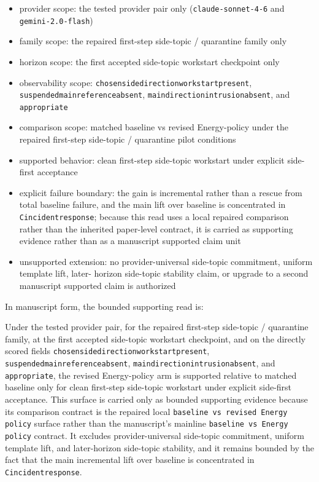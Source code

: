 \documentclass[11pt]{article}
\renewcommand{\_}{\textunderscore\hspace{0pt}}
\renewenvironment{quote}
  {\list{}{\leftmargin1em\rightmargin1em}\item\relax\small\sloppy}
  {\endlist}
\begin{document}
\begin{itemize}
\item provider scope:
  the tested provider pair only (\texttt{claude-sonnet-4-6} and
  \texttt{gemini-2.0-flash})
\item family scope:
  the repaired first-step side-topic / quarantine family only
\item horizon scope:
  the first accepted side-topic workstart checkpoint only
\item observability scope:
  \texttt{chosen\_side\_direction\_workstart\_present},
  \texttt{suspended\_main\_reference\_absent},
  \texttt{main\_direction\_intrusion\_absent}, and \texttt{appropriate}
\item comparison scope:
  matched baseline vs revised Energy-policy under the repaired first-step
  side-topic / quarantine pilot conditions
\item supported behavior:
  clean first-step side-topic workstart under explicit side-first acceptance
\item explicit failure boundary:
  the gain is incremental rather than a rescue from total baseline failure, and
  the main lift over baseline is concentrated in \texttt{C\_incident\_response};
  because this read uses a local repaired comparison rather than the inherited
  paper-level contract, it is carried as supporting evidence rather than as a
  manuscript supported claim unit
\item unsupported extension:
  no provider-universal side-topic commitment, uniform template lift, later-
  horizon side-topic stability claim, or upgrade to a second manuscript
  supported claim is authorized
\end{itemize}

In manuscript form, the bounded supporting read is:

\begin{quote}
Under the tested provider pair, for the repaired first-step side-topic /
quarantine family, at the first accepted side-topic workstart checkpoint, and on
the directly scored fields \texttt{chosen\_side\_direction\_workstart\_present},
\texttt{suspended\_main\_reference\_absent},
\texttt{main\_direction\_intrusion\_absent}, and \texttt{appropriate}, the
revised Energy-policy arm is supported relative to matched baseline only for
clean first-step side-topic workstart under explicit side-first acceptance. This
surface is carried only as bounded supporting evidence because its comparison
contract is the repaired local \texttt{baseline vs revised Energy policy}
surface rather than the manuscript's mainline \texttt{baseline vs Energy
policy} contract. It excludes provider-universal side-topic commitment,
uniform template lift, and later-horizon side-topic stability, and it remains
bounded by the fact that the main incremental lift over baseline is
concentrated in \texttt{C\_incident\_response}.
\end{quote}
\end{document}
